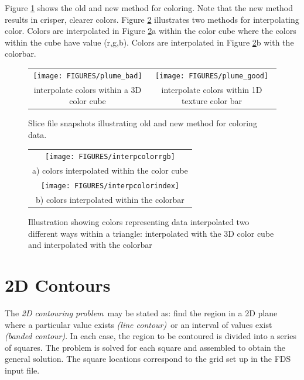 \documentclass[11pt,twoside]{book}
\begin{document}
Figure \ref{fignewslice} shows the old and new method for coloring.  Note that the new method results in crisper, clearer colors.
Figure \ref{colorinterp} illustrates two methods for interpolating color.  Colors are interpolated in Figure \ref{colorinterp}a within the color cube where the colors within the cube have value (r,g,b).  Colors are interpolated in Figure \ref{colorinterp}b with the colorbar.

\begin{figure}[\figoptions]
\begin{center}
\begin{tabular}{cc}
\texttt{[image: FIGURES/plume\_bad]}&\texttt{[image: FIGURES/plume\_good]}\\
interpolate colors within a 3D color cube&interpolate colors within 1D texture color bar\\
\end{tabular}
\caption [Slice file snapshots illustrating old and new method for
coloring data.] {Slice file snapshots illustrating old and new
method for coloring data.}
\label{fignewslice}%
\end{center}
\end{figure}



\begin{figure}[\figoptions]
\begin{center}
\begin{tabular}{c}
\texttt{[image: FIGURES/interpcolorrgb]}\\
a) colors interpolated within the color cube\\
\texttt{[image: FIGURES/interpcolorindex]}\\
b) colors interpolated within the colorbar\\
\end{tabular}
\end{center}
\caption[Color interpolation examples]
{Illustration showing colors representing data interpolated two different ways within a triangle: interpolated with the 3D color cube and interpolated with the colorbar}
\label{colorinterp}%
\end{figure}

%
%

\section{2D Contours}

The {\em 2D contouring problem}\ may be stated as: find the region in a 2D plane where a particular value exists {\em (line contour)}\ or an interval of values exist {\em (banded contour)}.   In each case, the  region to be contoured is divided into a series of squares.  The problem is solved for each square and assembled to obtain the general solution.  The square locations correspond to the grid set up in the FDS input file.
\end{document}
